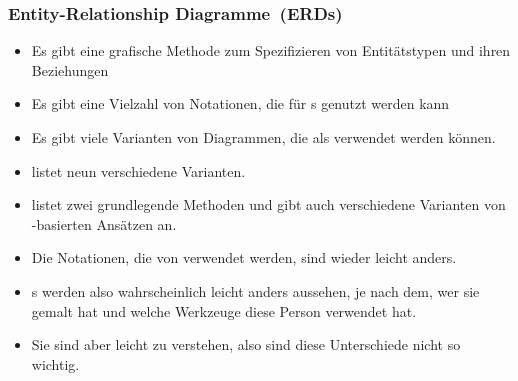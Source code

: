 \documentclass[aspectratio=169,mathserif,notheorems]{beamer}%
\begin{document}
\begin{frame}[t]%
\frametitle{Entity-Relationship Diagramme~(ERDs)}%
\begin{itemize}%
%
\item Es gibt eine grafische Methode zum Spezifizieren von Entitätstypen und ihren Beziehungen%
%
\item<3-> Es gibt eine Vielzahl von Notationen, die für s genutzt werden kann%
%
\item<8-> Es gibt viele Varianten von Diagrammen, die als  verwendet werden können.%
%
\item<9->  listet neun verschiedene Varianten\cite{S2024D:CDMERDE}.%
%
\item<10->  listet zwei grundlegende Methoden und gibt auch verschiedene Varianten von -basierten Ansätzen an\cite{SS2005EIDDDFDB:CDDRAAML}.%
%
\item<11-> Die Notationen, die von \citeauthor{V1999C5DMS:CDUTERM} verwendet werden, sind wieder leicht anders\cite{V1999C5DMS:CDUTERM}.%
%
\item<12-> s werden also wahrscheinlich leicht anders aussehen, je nach dem, wer sie gemalt hat und welche Werkzeuge diese Person verwendet hat.%
%
\item<13-> Sie sind aber leicht zu verstehen, also sind diese Unterschiede nicht so wichtig.%
\end{itemize}%
\end{frame}%
\end{document}
